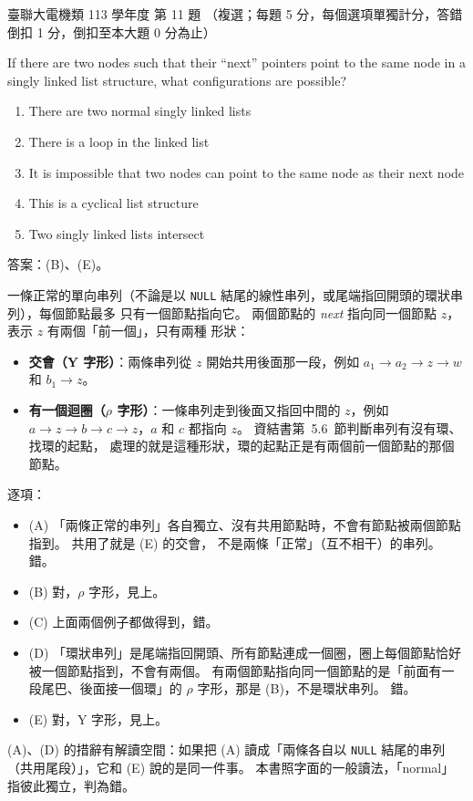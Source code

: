 \begin{pastexam}[label={px:ust-113-ee-ds-11}]{臺聯大電機類 113 學年度 第 11 題}
（複選；每題 5 分，每個選項單獨計分，答錯倒扣 1 分，倒扣至本大題 0 分為止）

If there are two nodes such that their ``next'' pointers point to the same node in a singly linked
list structure, what configurations are possible?
\begin{enumerate}[label=(\Alph*)]
\item There are two normal singly linked lists
\item There is a loop in the linked list
\item It is impossible that two nodes can point to the same node as their next node
\item This is a cyclical list structure
\item Two singly linked lists intersect
\end{enumerate}
\end{pastexam}

\begin{pastsoln}
答案：(B)、(E)。

一條正常的單向串列（不論是以 \texttt{NULL} 結尾的線性串列，或尾端指回開頭的環狀串列），每個節點最多
只有一個節點指向它。 兩個節點的 \textit{next} 指向同一個節點 $z$，表示 $z$ 有兩個「前一個」，只有兩種
形狀：
\begin{itemize}
\item \textbf{交會（Y 字形）}：兩條串列從 $z$ 開始共用後面那一段，例如 $a_1 \to a_2 \to z \to w$ 和
$b_1 \to z$。
\item \textbf{有一個迴圈（$\rho$ 字形）}：一條串列走到後面又指回中間的 $z$，例如
$a \to z \to b \to c \to z$，$a$ 和 $c$ 都指向 $z$。 資結書第~5.6~節判斷串列有沒有環、找環的起點，
處理的就是這種形狀，環的起點正是有兩個前一個節點的那個節點。
\end{itemize}

逐項：
\begin{itemize}
\item (A) 「兩條正常的串列」各自獨立、沒有共用節點時，不會有節點被兩個節點指到。 共用了就是 (E) 的交會，
不是兩條「正常」（互不相干）的串列。 錯。
\item (B) 對，$\rho$ 字形，見上。
\item (C) 上面兩個例子都做得到，錯。
\item (D) 「環狀串列」是尾端指回開頭、所有節點連成一個圈，圈上每個節點恰好被一個節點指到，不會有兩個。
有兩個節點指向同一個節點的是「前面有一段尾巴、後面接一個環」的 $\rho$ 字形，那是 (B)，不是環狀串列。 錯。
\item (E) 對，Y 字形，見上。
\end{itemize}
(A)、(D) 的措辭有解讀空間：如果把 (A) 讀成「兩條各自以 \texttt{NULL} 結尾的串列（共用尾段）」，它和 (E)
說的是同一件事。 本書照字面的一般讀法，「normal」指彼此獨立，判為錯。
\end{pastsoln}
